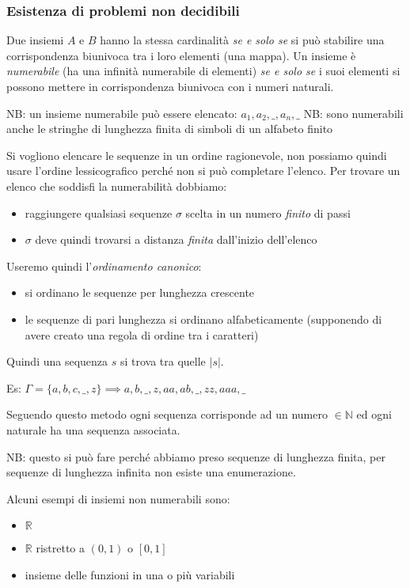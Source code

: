 \subsubsection{Esistenza di problemi non decidibili}
Due insiemi $A$ e $B$ hanno la stessa cardinalità \emph{se e solo se} si può stabilire una corrispondenza biunivoca tra i loro elementi (una mappa).
Un insieme è \emph{numerabile} (ha una infinità numerabile di elementi) \emph{se e solo se} i suoi elementi si possono mettere in corrispondenza biunivoca con i numeri naturali.

NB: un insieme numerabile può essere elencato: $a_1, a_2, \_, a_n, \_ $
NB: sono numerabili anche le stringhe di lunghezza finita di simboli di un alfabeto finito

Si vogliono elencare le sequenze in un ordine ragionevole, non possiamo quindi usare l'ordine lessicografico perché non si può completare l'elenco. Per trovare un elenco che soddisfi la numerabilità dobbiamo:
\begin{itemize}
    \item raggiungere qualsiasi sequenze $\sigma$ scelta in un numero \emph{finito} di passi
    \item $\sigma$ deve quindi trovarsi a distanza \emph{finita} dall'inizio dell'elenco
\end{itemize}

Useremo quindi l'\emph{ordinamento canonico}:
\begin{itemize}
    \item si ordinano le sequenze per lunghezza crescente
    \item le sequenze di pari lunghezza si ordinano alfabeticamente (supponendo di avere creato una regola di ordine tra i caratteri)
\end{itemize}

Quindi una sequenza $s$ si trova tra quelle $|s|$.

Es: $\Gamma = \{ a, b, c, \_, z \} \implies a, b, \_, z, aa, ab, \_, zz, aaa, \_ $

Seguendo questo metodo ogni sequenza corrisponde ad un numero $\in \mathbb{N}$ ed ogni naturale ha una sequenza associata.

NB: questo si può fare perché abbiamo preso sequenze di lunghezza finita, per sequenze di lunghezza infinita non esiste una enumerazione.

Alcuni esempi di insiemi non numerabili sono:
\begin{itemize}
    \item $\mathbb{R}$
    \item $\mathbb{R}$ ristretto a $(0, 1)$ o $[0, 1]$
    \item insieme delle funzioni in una o più variabili
\end{itemize}

